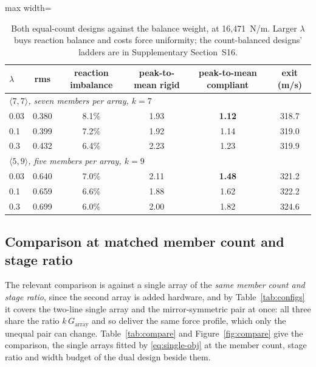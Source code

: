 \documentclass[preprint,12pt,number]{elsarticle}
\newcommand{\Garr}{G_{\mathrm{array}}}
\newcommand{\cfg}[2]{\langle #1,#2\rangle}
\newcommand{\ptm}{peak-to-mean}
\begin{document}
\begin{table}[H]
\centering
\caption{Both equal-count designs against the balance weight, at 16,471~N/m. Larger $\lambda$ buys reaction balance and costs force uniformity; the count-balanced designs' ladders are in Supplementary Section~S16.}
\label{tab:lamsweep}
\begin{adjustbox}{max width=\linewidth}
\begin{tabular}{lccccc}
\toprule
$\lambda$ & rms & reaction imbalance & \ptm{} rigid & \ptm{} compliant & exit (m/s) \\
\midrule
\multicolumn{6}{l}{\emph{$\cfg{7}{7}$, seven members per array, $k=7$}}\\
0.03 & 0.380 & 8.1\% & 1.93 & \textbf{1.12} & 318.7 \\
0.1  & 0.399 & 7.2\% & 1.92 & 1.14 & 319.0 \\
0.3  & 0.432 & 6.4\% & 2.23 & 1.23 & 319.9 \\
\midrule
\multicolumn{6}{l}{\emph{$\cfg{5}{9}$, five members per array, $k=9$}}\\
0.03 & 0.640 & 7.0\% & 2.11 & \textbf{1.48} & 321.2 \\
0.1  & 0.659 & 6.6\% & 1.88 & 1.62 & 322.2 \\
0.3  & 0.699 & 6.0\% & 2.00 & 1.82 & 324.6 \\
\bottomrule
\end{tabular}
\end{adjustbox}
\end{table}

\subsection{Comparison at matched member count and stage ratio}
\label{sec:compare}

The relevant comparison is against a single array of the \emph{same member count and stage ratio}, since the second array is added hardware, and by Table~\ref{tab:configs} it covers the two-line single array and the mirror-symmetric pair at once: all three share the ratio $k\,\Garr$ and so deliver the same force profile, which only the unequal pair can change. Table~\ref{tab:compare} and Figure~\ref{fig:compare} give the comparison, the single arrays fitted by \eqref{eq:single-obj} at the member count, stage ratio and width budget of the dual design beside them.
\end{document}
